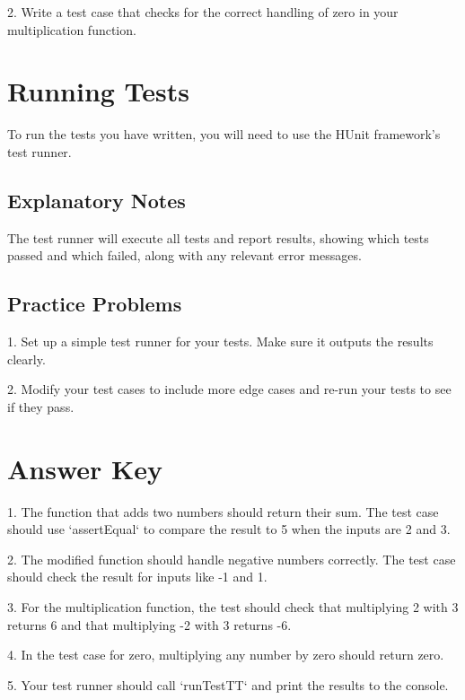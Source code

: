 \documentclass{article}
\begin{document}
2. Write a test case that checks for the correct handling of zero in your multiplication function.

\section*{Running Tests}
To run the tests you have written, you will need to use the HUnit framework's test runner.

\subsection*{Explanatory Notes}
The test runner will execute all tests and report results, showing which tests passed and which failed, along with any relevant error messages.

\subsection*{Practice Problems}
1. Set up a simple test runner for your tests. Make sure it outputs the results clearly.

2. Modify your test cases to include more edge cases and re-run your tests to see if they pass.

\section*{Answer Key}
1. The function that adds two numbers should return their sum. The test case should use `assertEqual` to compare the result to 5 when the inputs are 2 and 3.

2. The modified function should handle negative numbers correctly. The test case should check the result for inputs like -1 and 1.

3. For the multiplication function, the test should check that multiplying 2 with 3 returns 6 and that multiplying -2 with 3 returns -6.

4. In the test case for zero, multiplying any number by zero should return zero.

5. Your test runner should call `runTestTT` and print the results to the console.
\end{document}
